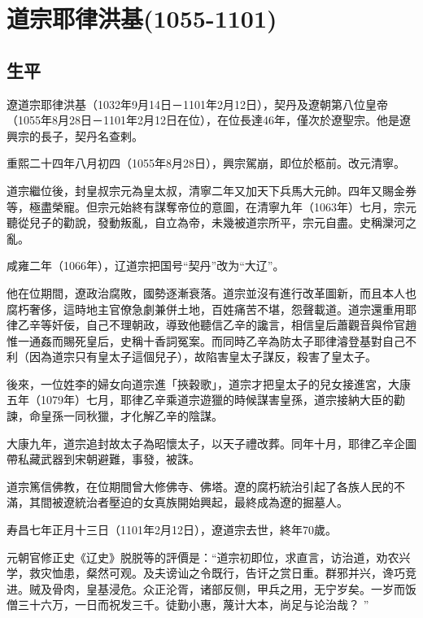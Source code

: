 
\section{道宗耶律洪基\tiny(1055-1101)}

\subsection{生平}

遼道宗耶律洪基（1032年9月14日－1101年2月12日），契丹及遼朝第八位皇帝（1055年8月28日－1101年2月12日在位），在位長達46年，僅次於遼聖宗。他是遼興宗的長子，契丹名查剌。

重熙二十四年八月初四（1055年8月28日），興宗駕崩，即位於柩前。改元清寧。

道宗繼位後，封皇叔宗元為皇太叔，清寧二年又加天下兵馬大元帥。四年又賜金券等，極盡榮寵。但宗元始終有謀奪帝位的意圖，在清寧九年（1063年）七月，宗元聽從兒子的勸說，發動叛亂，自立為帝，未幾被道宗所平，宗元自盡。史稱灤河之亂。

咸雍二年（1066年），辽道宗把国号“契丹”改为“大辽”。

他在位期間，遼政治腐敗，國勢逐漸衰落。道宗並沒有進行改革圖新，而且本人也腐朽奢侈，這時地主官僚急劇兼併土地，百姓痛苦不堪，怨聲載道。道宗還重用耶律乙辛等奸佞，自己不理朝政，導致他聽信乙辛的讒言，相信皇后蕭觀音與伶官趙惟一通姦而賜死皇后，史稱十香詞冤案。而同時乙辛為防太子耶律濬登基對自己不利（因為道宗只有皇太子這個兒子），故陷害皇太子謀反，殺害了皇太子。

後來，一位姓李的婦女向道宗進「挾穀歌」，道宗才把皇太子的兒女接進宮，大康五年（1079年）七月，耶律乙辛乘道宗遊獵的時候謀害皇孫，道宗接納大臣的勸諫，命皇孫一同秋獵，才化解乙辛的陰謀。

大康九年，道宗追封故太子為昭懷太子，以天子禮改葬。同年十月，耶律乙辛企圖帶私藏武器到宋朝避難，事發，被誅。

道宗篤信佛教，在位期間曾大修佛寺、佛塔。遼的腐朽統治引起了各族人民的不滿，其間被遼統治者壓迫的女真族開始興起，最終成為遼的掘墓人。

寿昌七年正月十三日（1101年2月12日），遼道宗去世，終年70歲。

元朝官修正史《辽史》脱脱等的評價是：“道宗初即位，求直言，访治道，劝农兴学，救灾恤患，粲然可观。及夫谤讪之令既行，告讦之赏日重。群邪并兴，谗巧竞进。贼及骨肉，皇基浸危。众正沦胥，诸部反侧，甲兵之用，无宁岁矣。一岁而饭僧三十六万，一日而祝发三千。徒勤小惠，蔑计大本，尚足与论治哉？ ”

